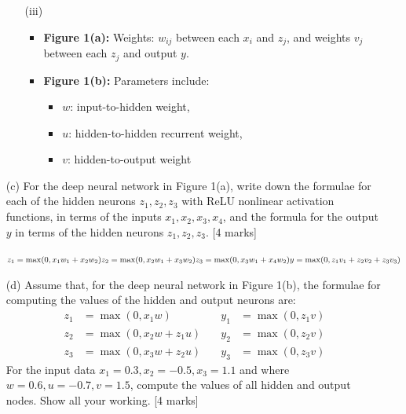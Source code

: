 \begin{enumerate}
{\begin{enumerate}
            \item[(iii)]
            \begin{itemize}
                \item \textbf{Figure 1(a):} Weights: $w_{ij}$ between each $x_i$ and $z_j$, and weights $v_j$ between each $z_j$ and output $y$.
                \item \textbf{Figure 1(b):} Parameters include:
                \begin{itemize}
                    \item $w$: input-to-hidden weight,
                    \item $u$: hidden-to-hidden recurrent weight,
                    \item $v$: hidden-to-output weight
                \end{itemize}
            \end{itemize}
        \end{enumerate}
    }
    \item[(c)] For the deep neural network in Figure 1(a), write down the formulae for each of the hidden neurons $z_1, z_2, z_3$ with ReLU nonlinear activation functions, in terms of the inputs $x_1, x_2, x_3, x_4$, and the formula for the output $y$ in terms of the hidden neurons $z_1, z_2, z_3$. [4 marks]
    {\color{blue}

    \begin{math}
    z_1 = \max(0, x_1w_1 + x_2w_2) \\
    z_2 = \max(0, x_2w_1 + x_3w_2) \\
    z_3 = \max(0, x_3w_1 + x_4w_2) \\
    y = \max(0, z_1v_1 +z_2v_2 + z_3v_3) \\
    \end{math}
    }
    \item[(d)] Assume that, for the deep neural network in Figure 1(b), the formulae for computing the values of the hidden and output neurons are:
    \[
    \begin{aligned}
    z_1 &= \max(0, x_1w) &\quad y_1 &= \max(0, z_1v) \\
    z_2 &= \max(0, x_2w + z_1u) &\quad y_2 &= \max(0, z_2v) \\
    z_3 &= \max(0, x_3w + z_2u) &\quad y_3 &= \max(0, z_3v)
    \end{aligned}
    \]
    For the input data $x_1 = 0.3, x_2 = -0.5, x_3 = 1.1$ and where $w = 0.6, u = -0.7, v = 1.5$, compute the values of all hidden and output nodes. Show all your working. [4 marks]


\end{enumerate}
